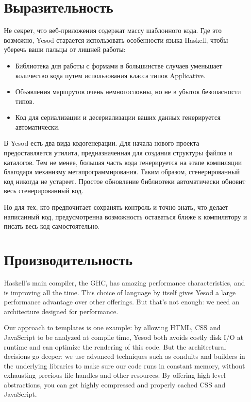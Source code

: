 \section{Выразительность}

Не секрет, что веб-приложения содержат массу шаблонного кода. Где это возможно, Yesod старается использовать особенности языка Haskell, чтобы уберечь ваши пальцы от лишней работы:

\begin{itemize}
  \item Библиотека для работы с формами в большинстве случаев уменьшает количество кода путем использования класса типов Applicative.
  \item Объявления маршрутов очень немногословны, но не в убыток безопасности типов.
  \item Код для сериализации и десериализации ваших данных генерируется автоматически.
\end{itemize}

В Yesod есть два вида кодогенерации. Для начала нового проекта предоставляется утилита, предназначенная для создания структуры файлов и каталогов. Тем не менее, большая часть кода генерируется на этапе компиляции благодаря механизму метапрограммирования. Таким образом, сгенерированный код никогда не устареет. Простое обновление библиотеки автоматически обновит весь сгенерированный код.

Но для тех, кто предпочитает сохранять контроль и точно знать, что делает написанный код, предусмотренна возможность оставаться ближе к компилятору и писать весь код самостоятельно.

\section{Производительность}

Haskell's main compiler, the GHC, has amazing performance characteristics, and is improving all the time. This choice of language by itself gives Yesod a large performance advantage over other offerings. But that's not enough: we need an architecture designed for performance.

Our approach to templates is one example: by allowing HTML, CSS and JavaScript to be analyzed at compile time, Yesod both avoids costly disk I/O at runtime and can optimize the rendering of this code. But the architectural decisions go deeper: we use advanced techniques such as conduits and builders in the underlying libraries to make sure our code runs in constant memory, without exhausting precious file handles and other resources. By offering high-level abstractions, you can get highly compressed and properly cached CSS and JavaScript.

